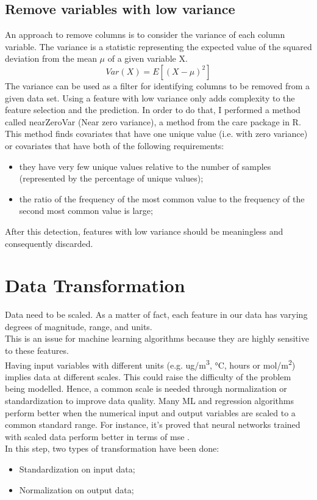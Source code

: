 \subsection{Remove variables with low variance}
An approach to remove columns is to consider the variance of each column variable. The variance is a statistic representing the expected value of the squared deviation from the mean $\mu$ of a given variable X. 
\begin{equation}
  Var(X) = E[(X-\mu)^2]
\end{equation}
The variance can be used as a filter for identifying columns to be removed from a given data set. 
Using a feature with low variance only adds complexity to the feature selection and the prediction.\newline
In order to do that, I performed a method called nearZeroVar (Near zero variance), a method from the \gls{care} package in R.\\
This method finds covariates that have one unique value (i.e. with zero variance) or covariates that have both of the following requirements:
\begin{itemize}
\item they have very few unique values relative to the number of samples (represented by the percentage of unique values);
\item the ratio of the frequency of the most common value to the frequency of the second most common value is large;
\end{itemize}
After this detection, features with low variance should be meaningless and consequently discarded. 
\section{Data Transformation}
Data need to be scaled. As a matter of fact, each feature in our data has varying degrees of magnitude, range, and units. \\This is an issue for machine learning algorithms because they are highly sensitive to these features.\\ 
Having input variables with different units (e.g. ug/m\textsuperscript{3}, °C, hours or mol/m\textsuperscript{2}) implies data at different scales. This could raise the difficulty of the problem being modelled. \newline
Hence, a common scale is needed through normalization or standardization to improve data quality.\newline
Many ML and regression algorithms perform better when the numerical input and output variables are scaled to a common standard range. \newline
For instance, it's proved that neural networks trained with scaled data perform better in terms of \gls{mse}  \cite{shanker1996effect}.\\
In this step, two types of transformation have been done:
\begin{itemize}
    \item Standardization on input data;
    \item Normalization on output data;
\end{itemize}
